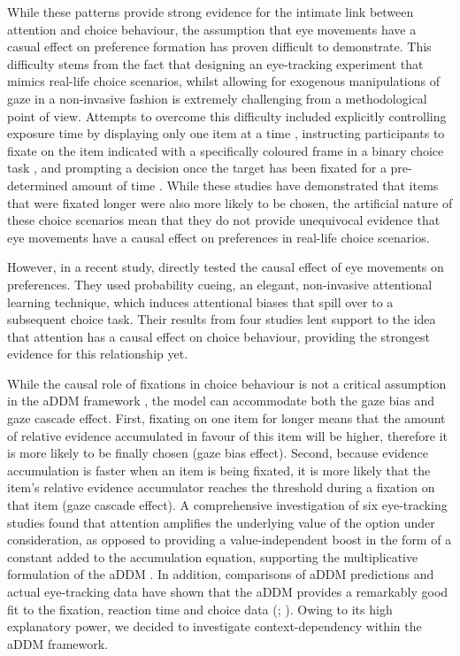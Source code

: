 \documentclass[11pt,a4paper]{article}
\begin{document}
While these patterns provide strong evidence for the intimate link between attention and choice behaviour, the assumption that eye movements have a casual effect on preference formation has proven difficult to demonstrate. This difficulty stems from the fact that designing an eye-tracking experiment that mimics real-life choice scenarios, whilst allowing for exogenous manipulations of gaze in a non-invasive fashion is extremely challenging from a methodological point of view. Attempts to overcome this difficulty included explicitly controlling exposure time by displaying only one item at a time \cite{Armel2008}, instructing participants to fixate on the item indicated with a specifically coloured frame in a binary choice task \cite{Lim2011}, and prompting a decision once the target has been fixated for a pre-determined amount of time \cite{Parnamets2015}. While these studies have demonstrated that items that were fixated longer were also more likely to be chosen, the artificial nature of these choice scenarios mean that they do not provide unequivocal evidence that eye movements have a causal effect on preferences in real-life choice scenarios. 

However, in a recent study,  directly tested the causal effect of eye movements on preferences. They used probability cueing, an elegant, non-invasive attentional learning technique, which induces attentional biases that spill over to a subsequent choice task. Their results from four studies lent support to the idea that attention has a causal effect on choice behaviour, providing the strongest evidence for this relationship yet.

While the causal role of fixations in choice behaviour is not a critical assumption in the aDDM framework \cite{Krajbich2019}, the model can accommodate both the gaze bias and gaze cascade effect. First, fixating on one item for longer means that the amount of relative evidence accumulated in favour of this item will be higher, therefore it is more likely to be finally chosen (gaze bias effect). Second, because evidence accumulation is faster when an item is being fixated, it is more likely that the item's relative evidence accumulator reaches the threshold during a fixation on that item (gaze cascade effect). A comprehensive investigation of six eye-tracking studies found that attention amplifies the underlying value of the option under consideration, as opposed to providing a value-independent boost in the form of a constant added to the accumulation equation, supporting the multiplicative formulation of the aDDM \cite{Smith2019}. In addition, comparisons of aDDM predictions and actual eye-tracking data have shown that the aDDM provides a remarkably good fit to the fixation, reaction time and choice data (; ). Owing to its high explanatory power, we decided to investigate context-dependency within the aDDM framework. 
\end{document}
